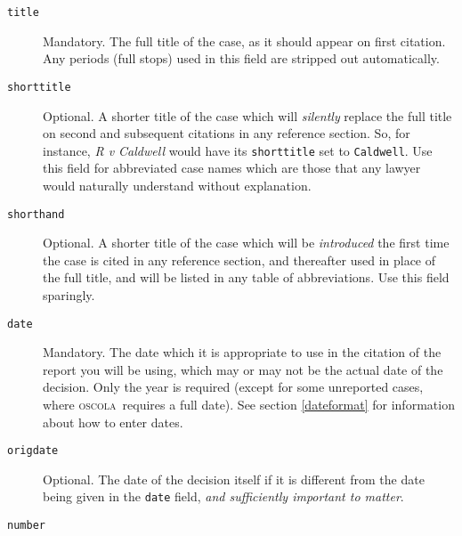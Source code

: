 \documentclass[a5paper,fontsize=9pt,DIV=1]{scrartcl}
\newcommand{\oscolashort}{\textsc{oscola}\nocite{oscola}}
\begin{document}
\begin{description}
\item[\texttt{title}]
Mandatory. The full title of the case, as it
  should appear on first citation. Any periods (full stops) used in this field are stripped out automatically.
\item[\texttt{shorttitle}]
Optional. A shorter title of the case which
  will \emph{silently} replace the full title on second and subsequent
  citations in any reference section. So, for instance, \emph{R v
    Caldwell} would have its \texttt{shorttitle} set to
  \texttt{Caldwell}. Use this field for abbreviated case names which
  are those that any lawyer would naturally understand without
  explanation.
\item[\texttt{shorthand}]
Optional. A shorter title of the case which
  will be \emph{introduced} the first time the case is cited in any
  reference section, and thereafter used in place of the full title,
  and will be listed in any table of abbreviations. Use this field
  sparingly.
\item[\texttt{date}]
Mandatory. The date which it is appropriate to
  use in the citation of the report you will be using, which may or
  may not be the actual date of the decision. Only the year is
  required (except for some unreported cases, where \oscolashort\
  requires a full date). See section \ref{dateformat}
  for information about how to enter dates.
\item[\texttt{origdate}]
Optional. The date of the decision itself if
  it is different from the date being given in the \texttt{date}
  field, \emph{and sufficiently important to matter}.
\item[\texttt{number}]

\end{description}
\end{document}
